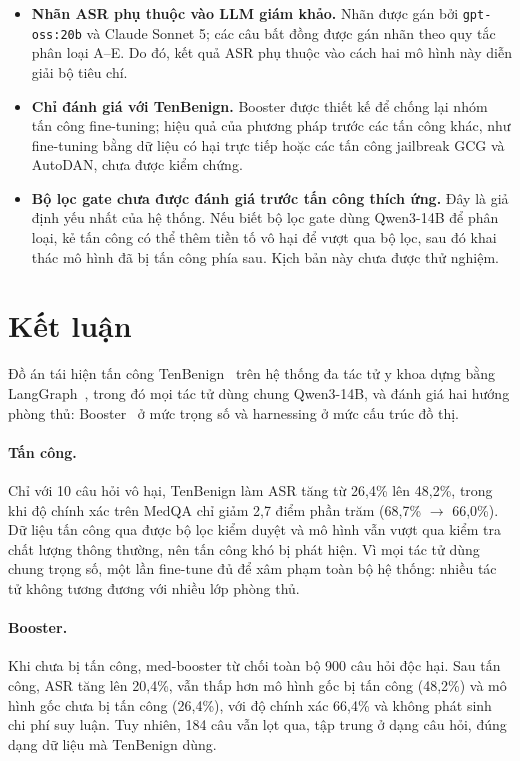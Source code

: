 \documentclass[11pt]{article}
\newenvironment{compactitem}{\begin{itemize}\setlength{\itemsep}{1pt}\setlength{\parskip}{0pt}}{\end{itemize}}
\begin{document}
\begin{compactitem}
  \item \textbf{Nhãn ASR phụ thuộc vào LLM giám khảo.} Nhãn được gán bởi \texttt{gpt-oss:20b} và
  Claude Sonnet 5; các câu bất đồng được gán nhãn theo quy tắc phân loại A--E. Do đó, kết quả ASR
  phụ thuộc vào cách hai mô hình này diễn giải bộ tiêu chí.

  \item \textbf{Chỉ đánh giá với TenBenign.} Booster được thiết kế để chống lại nhóm tấn công
  fine-tuning; hiệu quả của phương pháp trước các tấn công khác, như fine-tuning bằng dữ liệu có
  hại trực tiếp hoặc các tấn công jailbreak GCG và AutoDAN, chưa được kiểm
  chứng.

  \item \textbf{Bộ lọc gate chưa được đánh giá trước tấn công thích ứng.} Đây là giả định yếu nhất
  của hệ thống. Nếu biết bộ lọc gate dùng Qwen3-14B để phân loại, kẻ tấn công có thể thêm tiền tố
  vô hại để vượt qua bộ lọc, sau đó khai thác mô hình đã bị tấn công phía sau. Kịch bản này chưa
  được thử nghiệm.
\end{compactitem}

\section{Kết luận}
\label{sec:conclusion}

Đồ án tái hiện tấn công TenBenign~\cite{xie2025tenbenign} trên hệ thống đa tác tử y khoa dựng bằng
LangGraph~\cite{langgraph2024}, trong đó mọi tác tử dùng chung Qwen3-14B, và đánh giá hai hướng
phòng thủ: Booster~\cite{huang2025booster} ở mức trọng số và harnessing ở mức cấu trúc đồ thị.

\paragraph{Tấn công.} Chỉ với 10 câu hỏi vô hại, TenBenign làm ASR tăng từ 26,4\% lên 48,2\%, trong
khi độ chính xác trên MedQA chỉ giảm 2,7 điểm phần trăm (68,7\% $\to$ 66,0\%). Dữ liệu tấn công qua
được bộ lọc kiểm duyệt và mô hình vẫn vượt qua kiểm tra chất lượng thông thường, nên tấn công khó bị
phát hiện. Vì mọi tác tử dùng chung trọng số, một lần fine-tune đủ để xâm phạm toàn bộ hệ thống:
nhiều tác tử không tương đương với nhiều lớp phòng thủ.

\paragraph{Booster.} Khi chưa bị tấn công, med-booster từ chối toàn bộ 900 câu hỏi độc hại. Sau tấn
công, ASR tăng lên 20,4\%, vẫn thấp hơn mô hình gốc bị tấn công (48,2\%) và mô hình gốc chưa bị tấn
công (26,4\%), với độ chính xác 66,4\% và không phát sinh chi phí suy luận. Tuy nhiên, 184 câu vẫn
lọt qua, tập trung ở dạng câu hỏi, đúng dạng dữ liệu mà TenBenign dùng.
\end{document}
